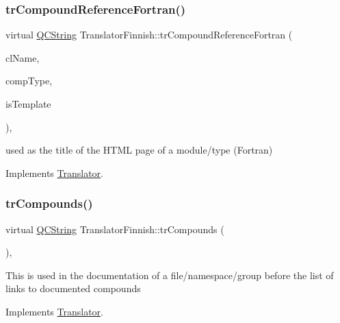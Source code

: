 \subsubsection{\texorpdfstring{trCompoundReferenceFortran()}{trCompoundReferenceFortran()}}
{\footnotesize\ttfamily virtual \mbox{\hyperlink{class_q_c_string}{Q\+C\+String}} Translator\+Finnish\+::tr\+Compound\+Reference\+Fortran (\begin{DoxyParamCaption}\item[{const char $\ast$}]{cl\+Name,  }\item[{\mbox{\hyperlink{class_class_def_ae70cf86d35fe954a94c566fbcfc87939}{Class\+Def\+::\+Compound\+Type}}}]{comp\+Type,  }\item[{bool}]{is\+Template }\end{DoxyParamCaption})\hspace{0.3cm}{\ttfamily [inline]}, {\ttfamily [virtual]}}

used as the title of the H\+T\+ML page of a module/type (Fortran) 

Implements \mbox{\hyperlink{class_translator}{Translator}}.

\mbox{\label{class_translator_finnish_ac8e9beb42411941bfa211bdb27ecccd4}} 
\subsubsection{\texorpdfstring{trCompounds()}{trCompounds()}}
{\footnotesize\ttfamily virtual \mbox{\hyperlink{class_q_c_string}{Q\+C\+String}} Translator\+Finnish\+::tr\+Compounds (\begin{DoxyParamCaption}{ }\end{DoxyParamCaption})\hspace{0.3cm}{\ttfamily [inline]}, {\ttfamily [virtual]}}

This is used in the documentation of a file/namespace/group before the list of links to documented compounds 

Implements \mbox{\hyperlink{class_translator}{Translator}}.

\mbox{\label{class_translator_finnish_aa341fb5cd687f0cb2be37b2d7a018732}} 
